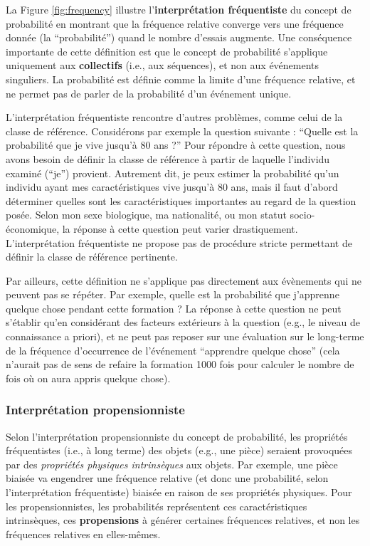 \documentclass[
  a4paper,11pt,twoside,onecolumn,openright,final,oldfontcommands]{memoir}
\theoremstyle{definition}
\theoremstyle{definition}
\theoremstyle{definition}
\theoremstyle{definition}
\theoremstyle{remark}
\begin{document}
La Figure \ref{fig:frequency} illustre l'\textbf{interprétation fréquentiste} du concept de probabilité en montrant que la fréquence relative converge vers une fréquence donnée (la ``probabilité'') quand le nombre d'essais augmente. Une conséquence importante de cette définition est que le concept de probabilité s'applique uniquement aux \textbf{collectifs} (i.e., aux séquences), et non aux événements singuliers. La probabilité est définie comme la limite d'une fréquence relative, et ne permet pas de parler de la probabilité d'un événement unique.

L'interprétation fréquentiste rencontre d'autres problèmes, comme celui de la classe de référence. Considérons par exemple la question suivante : ``Quelle est la probabilité que je vive jusqu'à 80 ans ?'' Pour répondre à cette question, nous avons besoin de définir la classe de référence à partir de laquelle l'individu examiné (``je'') provient. Autrement dit, je peux estimer la probabilité qu'un individu ayant mes caractéristiques vive jusqu'à 80 ans, mais il faut d'abord déterminer quelles sont les caractéristiques importantes au regard de la question posée. Selon mon sexe biologique, ma nationalité, ou mon statut socio-économique, la réponse à cette question peut varier drastiquement. L'interprétation fréquentiste ne propose pas de procédure stricte permettant de définir la classe de référence pertinente.

Par ailleurs, cette définition ne s'applique pas directement aux évènements qui ne peuvent pas se répéter. Par exemple, quelle est la probabilité que j'apprenne quelque chose pendant cette formation ? La réponse à cette question ne peut s'établir qu'en considérant des facteurs extérieurs à la question (e.g., le niveau de connaissance a priori), et ne peut pas reposer sur une évaluation sur le long-terme de la fréquence d'occurrence de l'événement ``apprendre quelque chose'' (cela n'aurait pas de sens de refaire la formation 1000 fois pour calculer le nombre de fois où on aura appris quelque chose).

\hypertarget{interpruxe9tation-propensionniste}{%
\subsubsection{Interprétation propensionniste}\label{interpruxe9tation-propensionniste}}

Selon l'interprétation propensionniste du concept de probabilité, les propriétés fréquentistes (i.e., à long terme) des objets (e.g., une pièce) seraient provoquées par des \emph{propriétés physiques intrinsèques} aux objets. Par exemple, une pièce biaisée va engendrer une fréquence relative (et donc une probabilité, selon l'interprétation fréquentiste) biaisée en raison de ses propriétés physiques. Pour les propensionnistes, les probabilités représentent ces caractéristiques intrinsèques, ces \textbf{propensions} à générer certaines fréquences relatives, et non les fréquences relatives en elles-mêmes.
\end{document}
